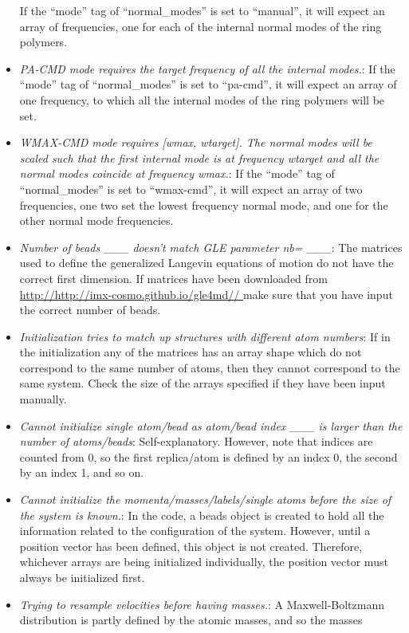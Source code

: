 \documentclass[11pt,english,fleqn]{report}
\begin{document}
\begin{itemize}
If the {}``mode'' tag of {}``normal\_modes'' is set to {}``manual'',
it will expect an array of frequencies, one for each of the internal
normal modes of the ring polymers. 
\item \emph{PA-CMD mode requires the target frequency of all the internal modes.}:
If the {}``mode'' tag of {}``normal\_modes'' is set to {}``pa-cmd'',
it will expect an array of one frequency, to which all the internal
modes of the ring polymers will be set. 
\item \emph{WMAX-CMD mode requires [wmax, wtarget]. The normal modes will be scaled such that the first internal mode is at frequency wtarget and all the normal modes coincide at frequency wmax.}:
If the {}``mode'' tag of {}``normal\_modes'' is set to {}``wmax-cmd'',
it will expect an array of two frequencies, one two set the lowest
frequency normal mode, and one for the other normal mode frequencies.
\item \emph{Number of beads \_\_\_ doesn't match GLE parameter nb= \_\_\_}:
The matrices used to define the generalized Langevin equations of
motion do not have the correct first dimension. If matrices have been
downloaded from \url{http://http://imx-cosmo.github.io/gle4md// } make sure that you
have input the correct number of beads.
\item \emph{Initialization tries to match up structures with different atom numbers}:
If in the initialization any of the matrices has an array shape which
do not correspond to the same number of atoms, then they cannot correspond
to the same system. Check the size of the arrays specified if they
have been input manually.
\item \emph{Cannot initialize single atom/bead as atom/bead index \_\_\_ is larger than the number of atoms/beads}:
Self-explanatory. However, note that indices are counted from 0, so
the first replica/atom is defined by an index 0, the second by an
index 1, and so on.
\item \emph{Cannot initialize the momenta/masses/labels/single atoms before the size of the system is known.}:
In the code, a beads object is created to hold all the information
related to the configuration of the system. However, until a position
vector has been defined, this object is not created. Therefore, whichever
arrays are being initialized individually, the position vector must
always be initialized first.
\item \emph{Trying to resample velocities before having masses.}: A Maxwell-Boltzmann
distribution is partly defined by the atomic masses, and so the masses

\end{itemize}
\end{document}
